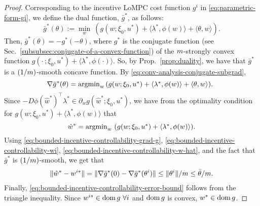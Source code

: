 \begin{proof}
Corresponding to the incentive LoMPC cost function $g^i$ in \eqref{eq:parametric-form-gi}, we define the dual function, $\bar{g}^*$, as follows:
\begin{equation}
\label{eq:bounded-incentive-controllability-conjugate-g}
    \bar{g}^*(\theta) := \textstyle{\min}_w \ ( g(w; \xi_0, u^*) + \langle \lambda^*, \phi(w) \rangle + \langle \theta, w\rangle ).
\end{equation}
Then, $\bar{g}^*(\theta) = -g^*(-\theta)$, where $g^*$ is the conjugate function (see Sec.~\ref{subsubsec:conjugate-of-a-convex-function}) of the $m$-strongly convex function $g(\cdot \,; \xi_0, u^*) + \langle \lambda^*, \phi(\cdot) \rangle$.
So, by Prop.~\ref{prop:duality}, we have that $\bar{g}^*$ is a $(1/m)$-smooth concave function.
By \eqref{eq:conv-analysis-conjugate-subgrad},
\begin{equation}
\label{eq:bounded-incentive-controllability-grad-g}
    \hspace{-4pt} \nabla \bar{g}^*(\theta) = \textstyle{\operatorname*{argmin}}_w \, ( g(w; \xi_0, u^*) + \langle \lambda^*, \phi(w) \rangle + \langle \theta, w\rangle ).
\end{equation}
Since $-D\phi(\hat{w}^*)^\top\lambda^* \in \partial_w g(\hat{w}^*; \xi_0, u^*)$, we have from the optimality condition for $g(w; \xi_0, u^*) + \langle \lambda^*, \phi(w)\rangle$ that~\cite[Thm.~23.8]{rockafellar1997convex}
\begin{equation}
\label{eq:bounded-incentive-controllability-w-hat}
    \hat{w}^* = \textstyle{\operatorname*{argmin}}_w \ ( g(w; \xi_0, u^*) + \langle \lambda^*, \phi(w) \rangle ).
\end{equation}
Using \eqref{eq:bounded-incentive-controllability-grad-g}, \eqref{eq:bounded-incentive-controllability-wi}, \eqref{eq:bounded-incentive-controllability-w-hat}, and the fact that $\bar{g}^*$ is $(1/m)$-smooth, we get that
\begin{align*}
    \lVert \hat{w}^* - w^{i*}\rVert = \lVert \nabla \bar{g}^*(0) - \nabla \bar{g}^*(\theta^i) \rVert \leq \lVert \theta^i \rVert/m \leq \bar{\theta}/m.
\end{align*}
Finally, \eqref{eq:bounded-incentive-controllability-error-bound} follows from the triangle inequality.
Since $w^{i*} \in \operatorname{dom}{g} \ \forall i$ and $\operatorname{dom}{g}$ is convex, $w^* \in \operatorname{dom}{g}$.
\end{proof}

